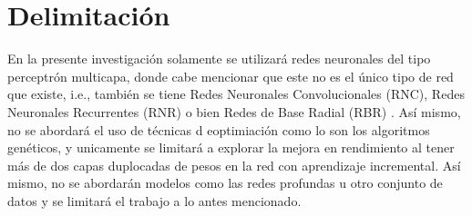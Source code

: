 \section{Delimitación}
\label{sec:delimitation}
	
	
    En la presente investigación solamente se utilizará redes neuronales del tipo perceptr\'on multicapa,  donde 
    cabe mencionar que este no es el único tipo de red que existe, i.e., también se tiene Redes Neuronales Convolucionales (RNC), Redes Neuronales Recurrentes (RNR) o bien Redes de Base Radial (RBR) \cite{royo2021}. Así mismo, no se abordará el uso de técnicas d eoptimiación como lo son los algoritmos genéticos, y unicamente se limitará a explorar la mejora en rendimiento al tener más de dos capas duplocadas de pesos en la red con aprendizaje incremental.  Así mismo, no se abordarán modelos como las redes profundas u otro conjunto de datos y se limitará el trabajo a lo antes mencionado.


